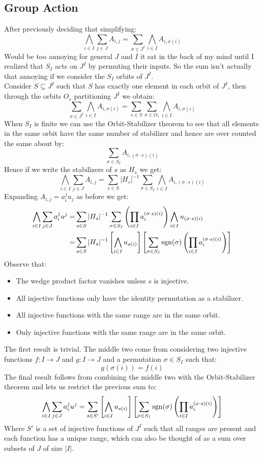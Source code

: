 \subsection{Group Action}
After previously deciding that simplifying:
\[\bigwedge_{i\in I}\sum_{j\in J} A_{i,j} = \sum_{\sigma\in J^I}\bigwedge_{i\in I}A_{i,\sigma(i)}\]
Would be too annoying for general $J$ and $I$ it sat in the back of my mind until I realized that $S_I$ acts on $J^I$ by permuting their inputs.
So the sum isn't actually that annoying if we consider the $S_I$ orbits of $J^I$.
\\

Consider $S\subseteq J^I$ such that $S$ has exactly one element in each orbit of $J^I$,
then through the orbits $O_s$ partitioning $J^I$ we obtain:
\[\sum_{\sigma\in J^I}\bigwedge_{i\in I}A_{i,\sigma(i)}=\sum_{s\in S}\sum_{\sigma\in O_s}\bigwedge_{i\in I}A_{i,\sigma(i)}\]
When $S_I$ is finite we can use the Orbit-Stabilizer theorem to see that all elements in the same orbit have the same number of stabilizer and hence are over counted the same about by:
\[\sum_{\sigma \in S_I}A_{i,(\sigma\cdot s)(i)}\]
Hence if we write the stabilizers of $s$ as $H_s$ we get:
\[\bigwedge_{i\in I}\sum_{j\in J} A_{i,j} = \sum_{s\in S} |H_s|^{-1}\sum_{\sigma \in S_I}\bigwedge_{i\in I}A_{i,(\sigma\cdot s)(i)}\]
Expanding $A_{i,j} = a^j_iu_j$ as before we get:
\[\begin{aligned}
\bigwedge_{i\in I}\sum_{j\in J} a^j_iu^j =& \sum_{s\in S} |H_s|^{-1}\sum_{\sigma \in S_I}\left(\prod_{i\in I}a_i^{(\sigma\cdot s)(i)}\right)\bigwedge_{i\in I}u_{(\sigma\cdot s)(i)}\\
=& \sum_{s\in S}|H_s|^{-1}\left[\bigwedge_{i\in I}u_{s(i)}\right]\left[ \sum_{\sigma \in S_I}\operatorname{sgn}(\sigma)\left(\prod_{i\in I}a_i^{(\sigma\cdot s)(i)}\right)\right]\\
\end{aligned}\]
Observe that:
\begin{itemize}
\item The wedge product factor vanishes unless $s$ is injective.
\item All injective functions only have the identity permutation as a stabilizer.
\item All injective functions with the same range are in the same orbit.
\item Only injective functions with the same range are in the same orbit.
\end{itemize}
The first result is trivial.
The middle two come from considering two injective functions $f:I\rightarrow J$ and $g:I\rightarrow J$ and a permutation $\sigma \in S_I$ such that:
\[g(\sigma(i)) = f(i)\]
The final result follows from combining the middle two with the Orbit-Stabilizer theorem and lets us restrict the previous sum to:
\[\bigwedge_{i\in I}\sum_{j\in J} a^j_iu^j =\sum_{s\in S'}\left[\bigwedge_{i\in I}u_{s(i)}\right]\left[ \sum_{\sigma \in S_I}\operatorname{sgn}(\sigma)\left(\prod_{i\in I}a_i^{(\sigma\cdot s)(i)}\right)\right]\]
Where $S'$ is a set of injective functions of $J^I$ such that all ranges are present and each function has a unique range,
which can also be thought of as a sum over subsets of $J$ of size $|I|$.

